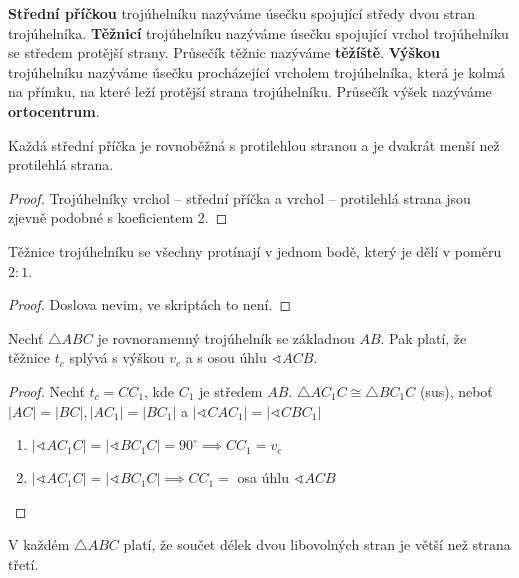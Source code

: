 \begin{definition}
  \textbf{Střední příčkou} trojúhelníku nazýváme úsečku spojující středy dvou stran trojúhelníka.
  \textbf{Těžnicí} trojúhelníku nazýváme úsečku spojující vrchol trojúhelníku se středem protější strany. Průsečík těžnic nazýváme \textbf{těžíště}.
  \textbf{Výškou} trojúhelníku nazýváme úsečku procházející vrcholem trojúhelníka, která je kolmá na přímku, na které leží protější strana trojúhelníku. Průsečík výšek nazýváme \textbf{ortocentrum}.
\end{definition}

\begin{veta}
  Každá střední příčka je rovnoběžná s protilehlou stranou a je dvakrát menší než protilehlá strana.
\end{veta}

\begin{proof}
  Trojúhelníky vrchol -- střední příčka a vrchol -- protilehlá strana jsou zjevně podobné s koeficientem 2.
\end{proof}

\begin{veta}
  Těžnice trojúhelníku se všechny protínají v jednom bodě, který je dělí v poměru $2:1$.
\end{veta}

\begin{proof}
  Doslova nevim, ve skriptách to není.
\end{proof}

\begin{veta}
  Nechť $\triangle ABC$ je rovnoramenný trojúhelník se základnou $AB$. Pak platí, že těžnice $t_c$ splývá s výškou $v_c$ a s osou úhlu $\sphericalangle ACB$.
\end{veta}

\begin{proof}
  Nechť $t_c = CC_1$, kde $C_1$ je středem $AB$.
  $\triangle AC_1 C \cong \triangle BC_1 C$ (sus), neboť $|AC| = |BC|, |AC_1| = |BC_1|$ a $|\sphericalangle CAC_1| = |\sphericalangle CBC_1|$
  \begin{enumerate}[$i.$]
    \item $|\sphericalangle AC_1 C| = |\sphericalangle BC_1 C| = 90^\circ \implies CC_1 = v_c$
    \item $|\sphericalangle AC_1 C| = |\sphericalangle BC_1 C| \implies CC_1 = $ osa úhlu $\sphericalangle ACB$\qedhere
  \end{enumerate}
\end{proof}

\begin{veta}
  V každém $\triangle ABC$ platí, že součet délek dvou libovolných stran je větší než strana třetí.
\end{veta}

